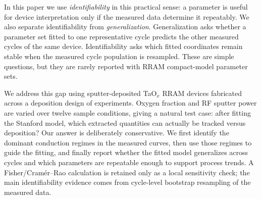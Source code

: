 \documentclass[journal]{IEEEtran}
\begin{document}
In this paper we use \emph{identifiability} in this practical sense: a
parameter is useful for device interpretation only if the measured data
determine it repeatably.  We also separate identifiability from
\emph{generalization}.  Generalization asks whether a parameter set fitted to
one representative cycle predicts the other measured cycles of the same
device.  Identifiability asks which fitted coordinates remain stable when the
measured cycle population is resampled.  These are simple questions, but they
are rarely reported with RRAM compact-model parameter sets.

We address this gap using sputter-deposited TaO$_x$ RRAM devices fabricated
across a deposition design of experiments.  Oxygen fraction and RF sputter
power are varied over twelve sample conditions, giving a natural test case:
after fitting the Stanford model, which extracted quantities can actually be
tracked versus deposition?  Our answer is deliberately conservative.  We
first identify the dominant conduction regimes in the measured curves, then
use those regimes to guide the fitting, and finally report whether the fitted
model generalizes across cycles and which parameters are repeatable enough to
support process trends.  A Fisher/Cram\'er--Rao calculation is retained only
as a local sensitivity check; the main identifiability evidence comes from
cycle-level bootstrap resampling of the measured data.
\end{document}
